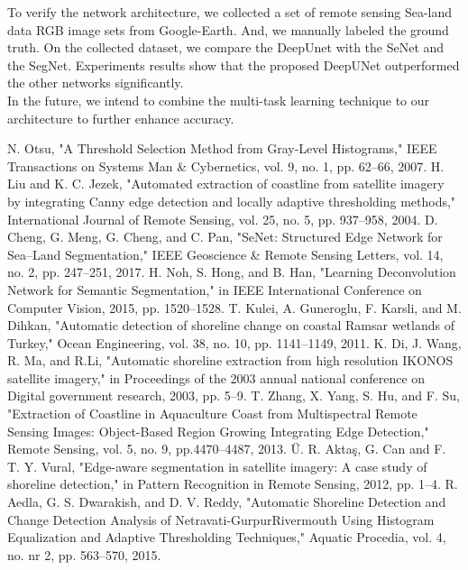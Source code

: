 \documentclass[conference]{IEEEtran}
\begin{document}
To verify the network architecture, we collected a set of remote sensing Sea-land data RGB image sets from Google-Earth. And, we manually labeled the ground truth. On the collected dataset, we compare the DeepUnet with the SeNet and the SegNet. Experiments results show that the proposed DeepUNet outperformed the other networks significantly. \\

In the future, we intend to combine the multi-task learning technique to our architecture to further enhance accuracy.\\

\begin{thebibliography}{00}
 N. Otsu, "A Threshold Selection Method from Gray-Level Histograms," IEEE Transactions on Systems Man \& Cybernetics, vol. 9, no. 1, pp. 62--66, 2007.
 H. Liu and K. C. Jezek, "Automated extraction of coastline from satellite imagery by integrating Canny edge detection and locally adaptive thresholding methods," International Journal of Remote Sensing, vol. 25, no. 5, pp. 937--958, 2004.
 D. Cheng, G. Meng, G. Cheng, and C. Pan, "SeNet: Structured Edge Network for Sea–Land Segmentation," IEEE Geoscience \& Remote Sensing Letters, vol. 14, no. 2, pp. 247--251, 2017.
 H. Noh, S. Hong, and B. Han, "Learning Deconvolution Network for Semantic Segmentation," in IEEE International Conference on Computer Vision, 2015, pp. 1520--1528.
 T. Kulei, A. Guneroglu, F. Karsli, and M. Dihkan, "Automatic detection of shoreline change on coastal Ramsar wetlands of Turkey," Ocean Engineering, vol. 38, no. 10, pp. 1141--1149, 2011.
 K. Di, J. Wang, R. Ma, and R.Li, "Automatic shoreline extraction from high resolution IKONOS satellite imagery," in Proceedings of the 2003 annual national conference on Digital government research, 2003, pp. 5--9.
 T. Zhang, X. Yang, S. Hu, and F. Su, "Extraction of Coastline in Aquaculture Coast from Multispectral Remote Sensing Images: Object-Based Region Growing Integrating Edge Detection," Remote Sensing, vol. 5, no. 9, pp.4470--4487, 2013.
 Ü. R. Aktaş, G. Can and F. T. Y. Vural, "Edge-aware segmentation in satellite imagery: A case study of shoreline detection," in Pattern Recognition in Remote Sensing, 2012, pp. 1--4.
 R. Aedla, G. S. Dwarakish, and D. V. Reddy, "Automatic Shoreline Detection and Change Detection Analysis of Netravati-GurpurRivermouth Using Histogram Equalization and Adaptive Thresholding Techniques," Aquatic Procedia, vol. 4, no. nr 2, pp. 563--570, 2015.

\end{thebibliography}
\end{document}
